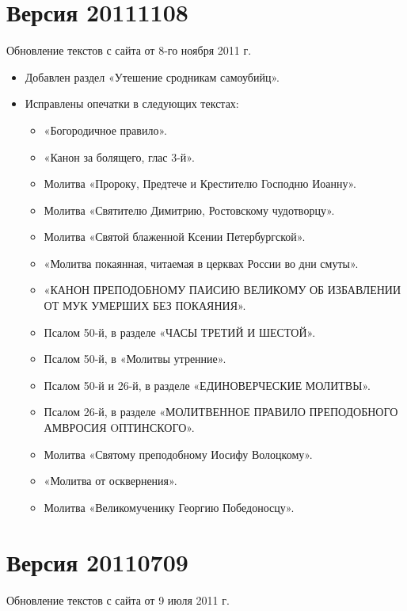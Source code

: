 \section*{Версия 20111108}

Обновление текстов с сайта от 8-го ноября 2011 г.

\begin{itemize}

\item Добавлен раздел «Утешение сродникам самоубийц».
\item Исправлены опечатки в следующих текстах:

\begin{itemize}

\item «Богородичное правило».
\item «Канон за болящего, глас 3-й».
\item Молитва «Пророку, Предтече и Крестителю Господню Иоанну».
\item Молитва «Святителю Димитрию, Ростовскому чудотворцу».
\item Молитва «Святой блаженной Ксении Петербургской».
\item «Молитва покаянная, читаемая в церквах России во дни смуты».
\item «КАНОН ПРЕПОДОБНОМУ ПАИСИЮ ВЕЛИКОМУ ОБ ИЗБАВЛЕНИИ ОТ МУК УМЕРШИХ БЕЗ ПОКАЯНИЯ».
\item Псалом 50-й, в разделе «ЧАСЫ ТРЕТИЙ И ШЕСТОЙ».
\item Псалом 50-й, в «Молитвы утренние».
\item Псалом 50-й и 26-й, в разделе «ЕДИНОВЕРЧЕСКИЕ МОЛИТВЫ».
\item Псалом 26-й, в разделе «МОЛИТВЕННОЕ ПРАВИЛО ПРЕПОДОБНОГО АМВРОСИЯ OПТИНСКОГО».
\item Молитва «Святому преподобному Иосифу Волоцкому».
\item «Молитва от осквернения».
\item Молитва «Великомученику Георгию Победоносцу».
\end{itemize}

\end{itemize}

\section*{Версия 20110709}

Обновление текстов с сайта от 9 июля 2011 г.

